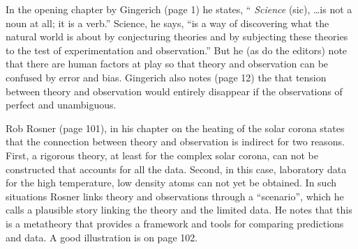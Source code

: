 In the opening chapter by Gingerich (page 1) he states, ``{\it
Science} (sic), \dots is not a noun at all; it is a verb.''  Science,
he says, ``is a way of discovering what the natural world is about by
conjecturing theories and by subjecting these theories to the test of
experimentation and observation.''  But he (as do the editors) note
that there are human factors at play so that theory and observation
can be confused by error and bias.  Gingerich also notes (page 12) the
that tension between theory and observation would entirely disappear
if the observations of perfect and unambiguous.

Rob Rosner (page 101), in his chapter on the heating of the solar
corona states that the connection between theory and observation is
indirect for two reasons. First, a rigorous theory, at least for the
complex solar corona, can not be constructed that accounts for all the
data. Second, in this case, laboratory data for the high temperature,
low density atoms can not yet be obtained.  In such situations Rosner
links theory and observations through a ``scenario'', which he calls a
plausible story linking the theory and the limited data.  He notes
that this is a metatheory that provides a framework and tools for
comparing predictions and data.  A good illustration is on page 102.
